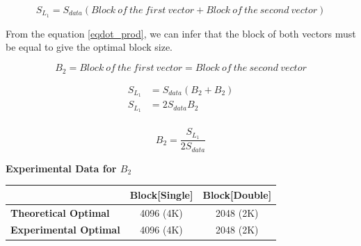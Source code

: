 \[S_{L_1} = S_{data}(Block\ of\ the\ first\ vector + Block\ of\ the\ second\ vector)\]

From the equation \ref{eqdot_prod}, we can infer that the block of both vectors must
be equal to give the optimal block size.

\[B_2 = Block\ of\ the\ first\ vector = Block\ of\ the\ second\ vector\]

\begin{align*}
    S_{L_1} &= S_{data}(B_2 + B_2)\\
    S_{L_1} &= 2S_{data}B_2\\
\end{align*}

\begin{equation}
    B_2 = \frac{S_{L_1}}{2S_{data}}
    \label{eq:dot_block2}
\end{equation}

\newpage
\textbf{Experimental Data for $B_2$}

\begin{figure}[htb]
    \centering
    \label{fig:dot_Stuning_block2}
    \qquad
    \label{fig:dot_Dtuning_block2}
\end{figure}

\begin{tabular}{l|c|c|}
    & \textbf{Block[Single]} & \textbf{Block[Double]}\\
    \hline
    \textbf{Theoretical Optimal} & 4096 (4K) & 2048 (2K)\\
    \hline
    \textbf{Experimental Optimal} & 4096 (4K) & 2048 (2K)\\
    \hline
\end{tabular}

